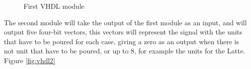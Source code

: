 \documentclass[12pt]{article}
\begin{document}
\begin{figure}[H]
\caption{First VHDL module}
\label{fig:vhdl1}
\end{figure}

The second module will take the output of the first module as an input, and will output five four-bit vectors, this vectors will represent the signal with the units that have to be poured for each case, giving a zero as an output when there is not unit that have to be poured, or up to 8, for example the units for the Latte. Figure \ref{fig:vhdl2}
\end{document}
